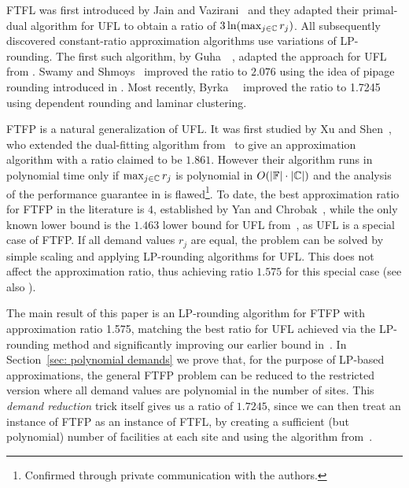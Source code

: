 \documentclass[11pt]{article}
\begin{document}
FTFL was first introduced by Jain and
Vazirani~\cite{JainV03} and they adapted their primal-dual
algorithm for UFL to obtain a ratio of
$3\ln(\max_{j\in\mathbb{C}}r_j)$.  All subsequently
discovered constant-ratio approximation algorithms use
variations of LP-rounding.  The first such algorithm, by
Guha~{\etal}~\cite{GuhaMM01}, adapted the approach for UFL
from \cite{ShmoysTA97}.  Swamy and Shmoys~\cite{SwamyS08}
improved the ratio to $2.076$ using the idea of pipage
rounding introduced in \cite{Svi02}. Most recently,
Byrka~{\etal}~\cite{ByrkaSS10} improved the ratio to 1.7245
using dependent rounding and laminar clustering.

FTFP is a natural generalization of UFL. It was first
studied by Xu and Shen~\cite{XuS09}, who extended the
dual-fitting algorithm from~\cite{JainMMSV03} to give an
approximation algorithm with a ratio claimed to be
$1.861$. However their algorithm runs in polynomial time
only if $\max_{j\in\mathbb{C}} r_j$ is polynomial in
$O(|\mathbb{F}|\cdot |\mathbb{C}|)$ and the analysis of the
performance guarantee in \cite{XuS09} is flawed\footnote{Confirmed through
  private communication with the authors.}.  To date, the
best approximation ratio for FTFP in the literature is $4$,
established by Yan and Chrobak~\cite{YanC11}, while the only
known lower bound is the $1.463$ lower bound for UFL
from~\cite{GuhaK98}, as UFL is a special case of FTFP.
If all demand values $r_j$ are equal, the problem can be solved
by simple scaling and applying LP-rounding algorithms for UFL. This does
not affect the approximation ratio, thus achieving ratio $1.575$ for this
special case (see also \cite{LiaoShen11}).

\smallskip

The main result of this paper is an LP-rounding algorithm
for FTFP with approximation ratio 1.575, matching the best
ratio for UFL achieved via the LP-rounding method
\cite{ByrkaGS10} and significantly improving our earlier
bound in~\cite{YanC11}. In Section~\ref{sec: polynomial
  demands} we prove that, for the purpose of LP-based
approximations, the general FTFP problem can be reduced to
the restricted version where all demand values are
polynomial in the number of sites.  This \emph{demand
  reduction} trick itself gives us a ratio of $1.7245$,
since we can then treat an instance of FTFP as an instance
of FTFL, by creating a sufficient (but polynomial) number of
facilities at each site and using the algorithm
from~\cite{ByrkaSS10}.
\end{document}
